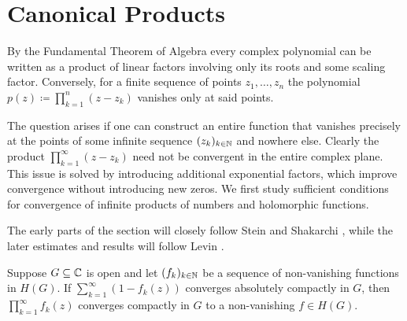 \section{Canonical Products} \label{sec:canonical-products}

By the Fundamental Theorem of Algebra every complex polynomial can be written as a product of linear factors involving only its roots and some scaling factor. Conversely, for a finite sequence of points $z_1, \hdots, z_n$ the polynomial $p(z) \coloneqq \prod_{k=1}^n (z - z_k)$ vanishes only at said points.

The question arises if one can construct an entire function that vanishes precisely at the points of some infinite sequence $(z_k)_{k \in \mathbb{N}}$ and nowhere else. Clearly the product $\prod_{k=1}^\infty (z - z_k)$ need not be convergent in the entire complex plane. This issue is solved by introducing additional exponential factors, which improve convergence without introducing new zeros. We first study sufficient conditions for convergence of infinite products of numbers and holomorphic functions.

The early parts of the section will closely follow Stein and Shakarchi \cite{stein-shakarchi-princeton}, while the later estimates and results will follow Levin \cite{levin-distribution-of-zeros}.

\begin{lemma} \label{lem:infinite-product-criteria}
    Suppose $G \subseteq \mathbb{C}$ is open and let $(f_k)_{k \in \mathbb{N}}$ be a sequence of non-vanishing functions in $H(G)$. If $\sum_{k=1}^\infty (1 - f_k(z))$ converges absolutely compactly in $G$, then $\prod_{k=1}^\infty f_k(z)$ converges compactly in $G$ to a non-vanishing $f \in H(G)$.
\end{lemma}
    
